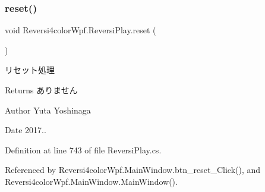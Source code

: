 \subsubsection{\texorpdfstring{reset()}{reset()}}
{\footnotesize\ttfamily void Reversi4color\+Wpf.\+Reversi\+Play.\+reset (\begin{DoxyParamCaption}{ }\end{DoxyParamCaption})}



リセット処理 

\begin{DoxyReturn}{Returns}
ありません 
\end{DoxyReturn}
\begin{DoxyAuthor}{Author}
Yuta Yoshinaga 
\end{DoxyAuthor}
\begin{DoxyDate}{Date}
2017.. 
\end{DoxyDate}


Definition at line 743 of file Reversi\+Play.\+cs.



Referenced by Reversi4color\+Wpf.\+Main\+Window.\+btn\+\_\+reset\+\_\+\+Click(), and Reversi4color\+Wpf.\+Main\+Window.\+Main\+Window().

